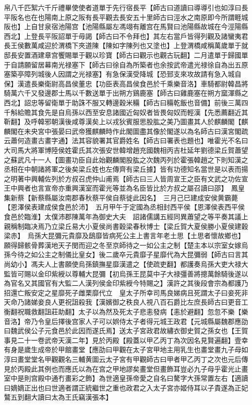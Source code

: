 帛八千匹絮六千斤禮畢使使者道單于先行宿長平【師古曰道讀曰導導引也如淳曰長平阪名也在也陽南上原之阪有長平觀去長安五十里師古曰涇水之南原即今所謂睚城阪也】上自甘泉宿池陽宫【池陽縣屬左馮翊有離宫在馬賢曰池陽縣故城在今涇陽縣西北】上登長平阪詔單于毋謁【師古曰不令拜也】其左右當戶皆得列觀及諸蠻夷君長王侯數萬咸迎於渭橋下夾道陳【陳如字陳列也又塗也】上登渭橋咸稱萬歲單于就邸長安置酒建章宫饗賜單于觀以珍寶【師古曰觀示也觀古玩翻】二月遣單于歸國單于自請願留居幕南光禄塞下【師古曰徐自為所築者也余按武帝遣光禄徐自為出五原塞築亭障列城後人因謂之光禄塞】有急保漢受降城【恐郅支來攻故請有急入城自保】漢遣長樂衛尉高昌侯董忠【功臣表高昌侯食邑於千乘樂音洛】車騎都尉韓昌將騎萬六千又發邊郡士馬以千數送單于出朔方鷄鹿塞【師古曰雞鹿塞在朔方窳渾縣之西北】詔忠等留衛單于助誅不服又轉邊穀米糒【師古曰糒乾飯也音備】前後三萬四千斛給贍其食先是自烏孫以西至安息諸國近匈奴者皆畏匈奴而輕漢【先悉薦翻近其靳翻】及呼韓邪朝漢後咸尊漢矣上以戎狄賓服思股肱之美乃圖畫其人於麒麟閣【麒麟閣在未央宮中張晏曰武帝獲麒麟時作此閣圖盡其像於閣遂以為名師古曰漢宮閣疏云蕭何造畫古畫字通】法其容貌署其官爵姓名【師古曰署表也題也】唯霍光不名曰大司馬大將軍博陸侯姓霍氏其次張安世韓增趙充國魏相丙吉杜延年劉德梁丘賀蕭望之蘇武凡十一人【圖畫功臣自此始觀麟閣股肱之次魏丙列於霍張韓趙之下則知漢之丞相在中朝諸將軍之後矣梁丘姓也左傳齊有梁丘據】皆有功德知名當世是以表而揚之明著中興輔佐列於方叔召虎仲山甫焉【師古曰三人皆周宣王之臣有文武之功佐宣王中興者也言宣帝亦重興漢室而霍光等並為名臣皆比於方叔之屬召讀曰邵】　鳳皇集新蔡【新蔡縣屬汝南郡春秋蔡平侯自蔡徙此因名】　三月己巳建成安侯黄霸薨【恩澤侯表建成侯食邑於沛】　五月甲午于定國為丞相封西平侯【恩澤侯表西平侯食邑於臨淮】太僕沛郡陳萬年為御史大夫　詔諸儒講五經同異蕭望之等平奏其議上親稱制臨决焉乃立梁丘易大小夏侯尚書穀梁春秋博士【梁丘賀大夏侯勝小夏侯建穀梁赤】　烏孫大昆彌元貴靡及鴟靡皆病死公主上書言年老土思【土思者懷故鄉也】願得歸骸骨葬漢地天子閔而迎之冬至京師待之一如公主之制【楚主本以宗室女嫁烏孫今待之如公主之制儀比皇女】後二歲卒元貴靡子星靡代為大昆彌弱【師古曰言其尚幼小】馮夫人上書願使烏孫鎮撫星靡漢遣之【使疏吏翻】都護奏烏孫大吏大禄大監皆可賜以金印紫綬以尊輔大昆彌【初烏孫王昆莫中子大禄彊善將摠萬餘騎後遂以為官名又其國官有大監二人漢列侯金印紫綬今特賜之】漢許之其後段會宗為都護乃招還亡叛安定之星靡死子雌栗靡代立　皇太子所幸司馬良娣病且死謂太子曰妾死非天命乃諸娣妾良人更祝詛殺我【漢嬪御之秩良人視八百石爵比左庶長師古曰更音工衡翻祝職救翻詛莊助翻】太子以為然及死太子悲恚發病【恚於避翻】忽忽不樂【樂音洛】帝乃令皇后擇後宫家人子可以娯侍太子者得元城王政君【元城縣屬魏郡應劭曰魏武侯公子元食邑於此因而遂氏焉】送太子宮政君故繡衣御史賀之孫女也【王賀事見二十一卷武帝天漢二年】見於丙殿【殿蓋以甲乙丙丁為次因名見賢遍翻】壹幸有身是歲生成帝於甲館畫堂【應劭曰甲觀在太子宮甲地主用乳生也畫堂畫九子母如淳曰畫堂堂名甲觀觀名三輔黄圖云太子宮有甲觀師古曰甲者甲乙丙丁之次也元后傳見於丙殿此其例也而應氏以為在宫之甲地謬矣畫堂但畫飾耳豈必九子母乎霍光止畫　室中是則宫殿中通冇畫彩之飾】為世適皇孫帝愛之自名曰驁字大孫常置左右【適讀曰嫡嫡正出也曰世適者謂正統繼世之重也政君之入太子宮亦姬侍耳以子貴遂為正妃鷔五到翻大讀曰太為王氏竊漢張本】

